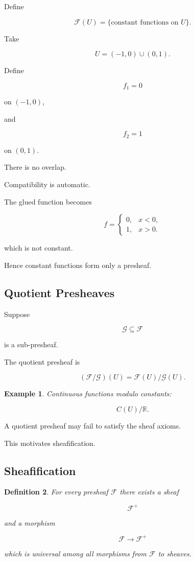 \documentclass[12pt,a4paper]{article}
\theoremstyle{notespace}
\newtheorem{definition}{Definition}[subsection]
\newtheorem{example}[definition]{Example}
\begin{document}
Define

\[
\mathcal F(U)
=
\{\text{constant functions on }U\}.
\]

Take

\[
U=(-1,0)\cup(0,1).
\]

Define

\[
f_1=0
\]

on \((-1,0)\),

and

\[
f_2=1
\]

on \((0,1)\).

There is no overlap.

Compatibility is automatic.

The glued function becomes

\[
f=
\begin{cases}
	0,&x<0,\\
	1,&x>0.
\end{cases}
\]

which is not constant.

Hence constant functions form only a presheaf.

\subsection{Quotient Presheaves}

Suppose

\[
\mathcal G\subseteq \mathcal F
\]

is a sub-presheaf.

The quotient presheaf is

\[
(\mathcal F/\mathcal G)(U)
=
\mathcal F(U)/\mathcal G(U).
\]

\begin{example}
	Continuous functions modulo constants:
	
	\[
	C(U)/\mathbb R.
	\]
\end{example}

A quotient presheaf may fail to satisfy the sheaf axioms.

This motivates sheafification.

\subsection{Sheafification}

\begin{definition}
	For every presheaf \(\mathcal F\) there exists a sheaf
	
	\[
	\mathcal F^+
	\]
	
	and a morphism
	
	\[
	\mathcal F\to\mathcal F^+
	\]
	
	which is universal among all morphisms from \(\mathcal F\) to sheaves.
\end{definition}
\end{document}
